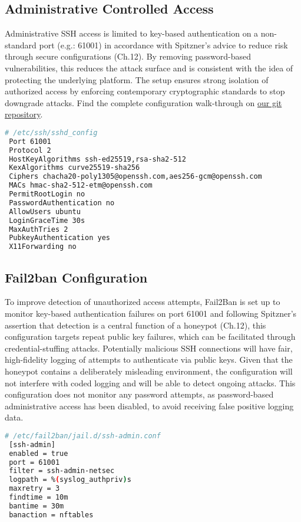 \documentclass{cls/ULBreport}
\begin{document}
        \subsection{Administrative Controlled Access}
    Administrative SSH access is limited to key-based authentication on a non-standard port (e.g.: 61001) in accordance with Spitzner's advice to reduce risk through secure configurations (Ch.12). By removing password-based vulnerabilities, this reduces the attack surface and is consistent with the idea of protecting the underlying platform. The setup ensures strong isolation of authorized access by enforcing contemporary cryptographic standards to stop downgrade attacks. Find the complete configuration walk-through on \href{https://github.com/nottoBD/netsec-cowrie-honey}{our git repository}.        
        \begin{lstlisting}[language=bash,caption={Securing Legitimate Access}]
 # /etc/ssh/sshd_config
 Port 61001
 Protocol 2
 HostKeyAlgorithms ssh-ed25519,rsa-sha2-512
 KexAlgorithms curve25519-sha256
 Ciphers chacha20-poly1305@openssh.com,aes256-gcm@openssh.com
 MACs hmac-sha2-512-etm@openssh.com
 PermitRootLogin no
 PasswordAuthentication no
 AllowUsers ubuntu
 LoginGraceTime 30s
 MaxAuthTries 2
 PubkeyAuthentication yes
 X11Forwarding no
        \end{lstlisting}
        
        
        \subsection{Fail2ban Configuration} To improve detection of unauthorized access attempts, Fail2Ban is set up to monitor key-based authentication failures on port 61001 and following Spitzner's assertion that detection is a central function of a honeypot (Ch.12), this configuration targets repeat public key failures, which can be facilitated through credential-stuffing attacks. Potentially malicious SSH connections will have fair, high-fidelity logging of attempts to authenticate via public keys. Given that the honeypot contains a deliberately misleading environment, the configuration will not interfere with coded logging and will be able to detect ongoing attacks. This configuration does not monitor any password attempts, as password-based administrative access has been disabled, to avoid receiving false positive logging data.
        
        \begin{lstlisting}[language=bash,caption={Custom Jail Rules}]
 # /etc/fail2ban/jail.d/ssh-admin.conf
 [ssh-admin]
 enabled = true
 port = 61001
 filter = ssh-admin-netsec
 logpath = %(syslog_authpriv)s
 maxretry = 3
 findtime = 10m
 bantime = 30m
 banaction = nftables
        \end{lstlisting}
        
\end{document}
